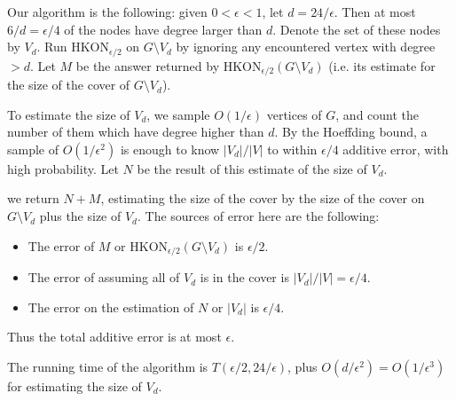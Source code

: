 \documentclass[11pt]{article} \usepackage{amssymb}
\newcommand{\eps}{\epsilon} \newcommand{\lam}{\lambda}
\begin{document}
\begin{enumerate}
  Our algorithm is the following: given $0 < \eps < 1$, let
  $d=24/\eps$. Then at most $6/d=\eps/4$ of the nodes have degree larger
  than $d$. Denote the set of these nodes by $V_d$. Run
  $\mbox{HKON}_{\eps/2}$ on $G \setminus V_d$ by ignoring any
  encountered vertex with degree $>d$. Let $M$ be the answer returned
  by $\mbox{HKON}_{\eps/2}(G \setminus V_d)$ (i.e. its estimate for
  the size of the cover of $G \setminus V_d$).

  To estimate the size of $V_d$, we sample $O(1/\eps)$ vertices of
  $G$, and count the number of them which have degree higher than
  $d$. By the Hoeffding bound, a sample of $O(1/\eps^2)$ is enough to
  know $|V_d|/|V|$ to within $\eps/4$ additive error, with high
  probability. Let $N$ be the result of this estimate of the size of
  $V_d$.

  we return $N+M$, estimating the size of the cover by the size of the
  cover on $G \setminus V_d$ plus the size of $V_d$. The sources of
  error here are the following:
  \begin{itemize}
  \item The error of $M$ or $\mbox{HKON}_{\eps/2}(G \setminus V_d)$ is
    $\eps/2$.
  \item The error of assuming all of $V_d$ is in the cover is
    $|V_d|/|V|=\eps/4$.
  \item The error on the estimation of $N$ or $|V_d|$ is $\eps/4$.
  \end{itemize}
  Thus the total additive error is at most $\eps$.

  The running time of the algorithm is $T(\eps/2,24/\eps)$, plus
  $O(d/\eps^2)=O(1/\eps^3)$ for estimating the size of $V_d$.
\end{enumerate}
\end{document}
